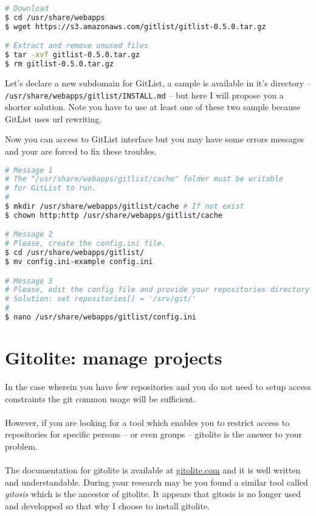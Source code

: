 \begin{lstlisting}[language=bash,caption=Download GitList]
# Download
$ cd /usr/share/webapps
$ wget https://s3.amazonaws.com/gitlist/gitlist-0.5.0.tar.gz

# Extract and remove unused files
$ tar -xvf gitlist-0.5.0.tar.gz
$ rm gitlist-0.5.0.tar.gz
\end{lstlisting}

Let's declare a new subdomain for GitList, a sample is available in it's directory 
-- \texttt{/usr/share/webapps/gitlist/INSTALL.md} -- but here I will propose you 
a shorter solution. Note you have to use at least one of these two sample because 
GitList uses url rewriting.

\lstset{language=bash,caption=GitList configuration for nginx}


Now you can access to GitList interface but you may have some errors messages and 
your are forced to fix these troubles.

\begin{lstlisting}[language=bash,caption=Fix GitList troubles]
# Message 1
# The "/usr/share/webapps/gitlist/cache" folder must be writable 
# for GitList to run.
#
$ mkdir /usr/share/webapps/gitlist/cache # If not exist
$ chown http:http /usr/share/webapps/gitlist/cache

# Message 2
# Please, create the config.ini file.
$ cd /usr/share/webapps/gitlist/
$ mv config.ini-example config.ini

# Message 3
# Please, edit the config file and provide your repositories directory
# Solution: set repositories[] = '/srv/git/'
#
$ nano /usr/share/webapps/gitlist/config.ini
\end{lstlisting}

\section{Gitolite: manage projects}

In the case wherein you have few repositories and you do not need to 
setup access constraints the git common usage will be sufficient.
\\\\
However, if you are looking for a tool which enables you to restrict 
access to repositories for specific persons -- or even groups --  
gitolite is the answer to your problem.
\\\\
The documentation for gitolite is available at \href{http://gitolite.com}
{gitolite.com} and it is well written and understandable. During 
your research may be you found a similar tool called \emph{gitosis} 
which is the ancestor of gitolite. It appears that gitosis is no longer 
used and developped so that why I choose to install gitolite.

